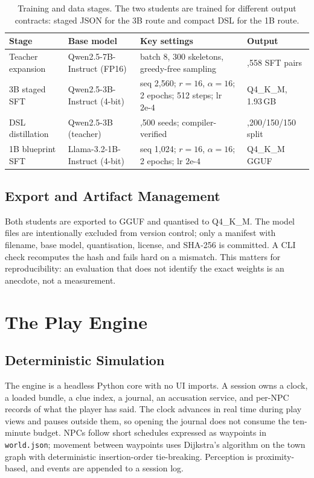 ﻿\documentclass[11pt,a4paper]{report}
\begin{document}
\begin{table}[htbp]
  \centering
  \small
  \setlength{\tabcolsep}{4pt}
  \begin{tabular}{@{}>{\raggedright\arraybackslash}p{2.7cm}>{\raggedright\arraybackslash}p{3.4cm}>{\raggedright\arraybackslash}p{4.6cm}>{\raggedright\arraybackslash}p{3.2cm}@{}}
    \toprule
    \textbf{Stage} & \textbf{Base model} & \textbf{Key settings} & \textbf{Output} \\
    \midrule
    Teacher expansion & Qwen2.5-7B-Instruct (FP16) & batch 8, 300 skeletons, greedy-free sampling & 2,558 SFT pairs \\
    3B staged SFT & Qwen2.5-3B-Instruct (4-bit) & seq 2,560; $r{=}16$, $\alpha{=}16$; 2 epochs; 512 steps; lr $2\text{e-}4$ & Q4\_K\_M, 1.93\,GB \\
    DSL distillation & Qwen2.5-3B (teacher) & 1,500 seeds; compiler-verified & 1,200/150/150 split \\
    1B blueprint SFT & Llama-3.2-1B-Instruct (4-bit) & seq 1,024; $r{=}16$, $\alpha{=}16$; 2 epochs; lr $2\text{e-}4$ & Q4\_K\_M GGUF \\
    \bottomrule
  \end{tabular}
  \caption{Training and data stages. The two students are trained for different output contracts: staged JSON for the 3B route and compact DSL for the 1B route.}
  \label{tab:training}
\end{table}

\section{Export and Artifact Management}
Both students are exported to GGUF and quantised to Q4\_K\_M. The model files are intentionally excluded from version control; only a manifest with filename, base model, quantisation, license, and SHA-256 is committed. A CLI check recomputes the hash and fails hard on a mismatch. This matters for reproducibility: an evaluation that does not identify the exact weights is an anecdote, not a measurement.

\chapter{The Play Engine}
\label{ch:play}

\section{Deterministic Simulation}
The engine is a headless Python core with no UI imports. A session owns a clock, a loaded bundle, a clue index, a journal, an accusation service, and per-NPC records of what the player has said. The clock advances in real time during play views and pauses outside them, so opening the journal does not consume the ten-minute budget. NPCs follow short schedules expressed as waypoints in \texttt{world.json}; movement between waypoints uses Dijkstra's algorithm on the town graph with deterministic insertion-order tie-breaking. Perception is proximity-based, and events are appended to a session log.
\end{document}
